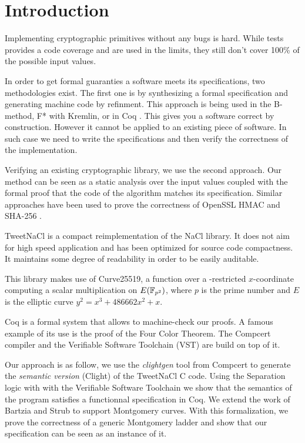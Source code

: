 \section{Introduction}

Implementing cryptographic primitives without any bugs is hard.
While tests provides a code coverage and are used in the limits,
they still don't cover 100\% of the possible input values.

In order to get formal guaranties a software meets its specifications,
two methodologies exist. The first one is by synthesizing a formal specification and
generating machine code by refinment. This approach is being used in the
B-method\cite{Abrial:1996:BAP:236705}, F* \cite{DBLP:journals/corr/BhargavanDFHPRR17} with Kremlin, or in Coq \cite{CpdtJFR}.
This gives you a software correct by construction. However it cannot be applied
to an existing piece of software. In such case we need to write the specifications
and then verify the correctness of the implementation.

Verifying an existing cryptographic library, we use the second approach.
Our method can be seen as a static analysis over the input values coupled
with the formal proof that the code of the algorithm matches its specification.
Similar approaches have been used to prove the correctness of OpenSSL HMAC
\cite{Beringer2015VerifiedCA} and SHA-256 \cite{Appel2015VerificationOA}.

TweetNaCl\cite{BGJ+15} is a compact reimplementation of the
NaCl\cite{BLS12} library. It does not aim for high speed
application and has been optimized for source code compactness.
It maintains some degree of readability in order to be easily auditable.

This library makes use of Curve25519\cite{Ber06}, a function over a -restricted
$x$-coordinate computing a scalar multiplication on $E(\mathbb{F}_{p^2})$, where $p$ is
the prime number \p and $E$ is the elliptic curve $y^2 = x^3 + 486662 x^2 + x$.

Coq is a formal system that allows to machine-check our proofs.
A famous example of its use is the proof of the Four Color Theorem.
The Compcert\cite{Leroy-backend} compiler and the Verifiable Software Toolchain
(VST)\cite{2012-Appel} are build on top of it.

Our approach is as follow, we use the \textit{clightgen} tool from Compcert to
generate the \textit{semantic version} (Clight\cite{Blazy-Leroy-Clight-09}) of
the TweetNaCl C code.
Using the Separation logic\cite{1969-Hoare,Reynolds02separationlogic}
with with the Verifiable Software Toolchain we show that the semantics of the
program satisfies a functionnal specification in Coq.
We extend the work of Bartzia and Strub \cite{DBLP:conf/itp/BartziaS14} to
support Montgomery curves.
With this formalization, we prove the correctness of a generic Montgomery ladder
and show that our specification can be seen as an instance of it.

